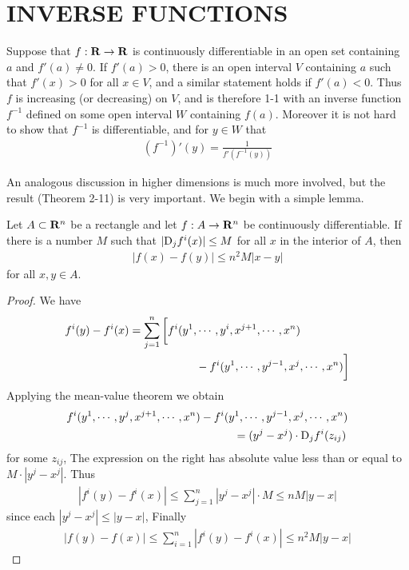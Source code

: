 \clearpage
\section{INVERSE FUNCTIONS}
Suppose that $f:\mathbf{R}\to \mathbf{R}$ is continuously differentiable in an open set containing
$a$ and $f'(a)\neq 0$. If $f'(a)>0$, there is an open interval $V$ containing $a$ such that 
$f'(x)>0$ for all $x\in V$, and a similar statement holds if $f'(a)<0$. Thus $f$ is increasing
(or decreasing) on $V$, and is therefore 1-1 with an inverse function $f^{-1}$ defined on some 
open interval $W$ containing $f(a)$. Moreover it is not hard to show that $f^{-1}$ is differentiable,
and for $y\in W$ that 
\begin{align*}
    (f^{-1})'(y) = \frac{1}{f'(f^{-1}(y))}
\end{align*}

An analogous discussion in higher dimensions is much more
involved, but the result (Theorem 2-11) is very important.
We begin with a simple lemma.

\begin{lemma}
    Let $A\subset \mathbf{R}^n$ be a rectangle and let $f:A\to \mathbf{R}^n$ be continuously differentiable.
    If there is a number $M$ such that $|\mathrm{D}_jf^i(x)| \le M$ for all $x$ in the interior of $A$, then 
    \begin{align*}
        \left|f(x) - f(y)\right| \le n^2M\left|x-y\right|
    \end{align*}
    for all $x, y\in A$.
\end{lemma}

\begin{proof}
    We have 
    \begin{align*}
        f^i(y) - f^i(x)
        &  = \sum_{j=1}^{n}\bigg[ f^i(y^1, \cdots, y^i, x^{j+1}, \cdots, x^n)\\
        &  \hspace*{6em} - f^i(y^1, \cdots, y^{j-1}, x^j, \cdots, x^n)\bigg]
    \end{align*}
    Applying the mean-value theorem we obtain 
    \begin{align*}
        f^i(y^1, \cdots, y^j, x^{j+1}, \cdots, x^n) 
        & - f^i(y^1, \cdots, y^{j-1}, x^j, \cdots, x^n)\\
        & \hspace*{3em} = (y^j-x^j) \cdot \mathrm{D}_jf^i(z_{ij})
    \end{align*}
    for some $z_{ij}$, The expression on the right has absolute value less than or equal to $M\cdot |y^j-x^j|$. 
    Thus 
    \begin{align*}
        \left|f^i(y) - f^i(x)\right| 
        \le \sum_{j=1}^{n}{|y^j-x^j|\cdot M} 
        \le nM|y-x| 
    \end{align*}
    since each $|y^j - x^j| \le |y-x|$, Finally
    \begin{align*}
        |f(y) - f(x)| 
        \le \sum_{i=1}^{n}{|f^i(y) - f^i(x)|}
        \le n^2M|y-x| 
    \end{align*}
\end{proof}

